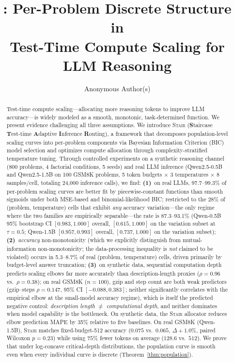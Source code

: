 \documentclass{article}
\title{\method{}: Per-Problem Discrete Structure in\\Test-Time Compute Scaling for LLM Reasoning}
\author{Anonymous Author(s)}
\newcommand{\method}{\textsc{Stair}}
\begin{document}
\maketitle

\begin{abstract}
Test-time compute scaling---allocating more reasoning tokens to improve LLM accuracy---is widely modeled as a smooth, monotonic, task-determined function.  We present evidence challenging all three assumptions.  We introduce \method{} (\textbf{S}taircase \textbf{T}est-time \textbf{A}daptive \textbf{I}nference \textbf{R}outing), a framework that decomposes population-level scaling curves into per-problem components via Bayesian Information Criterion (BIC) model selection and optimizes compute allocation through complexity-stratified temperature tuning.  Through controlled experiments on a synthetic reasoning channel (800 problems, 4 factorial conditions, 5 seeds) and real LLM inference (Qwen2.5-0.5B and Qwen2.5-1.5B on 100 GSM8K problems, 5 token budgets $\times$ 3 temperatures $\times$ 8 samples/cell, totaling 24{,}000 inference calls), we find:
\textbf{(1)}~on real LLMs, 97.7--99.3\% of per-problem scaling curves are better fit by piecewise-constant functions than smooth sigmoids under both MSE-based and binomial-likelihood BIC; restricted to the 28\% of (problem, temperature) cells that exhibit \emph{any} accuracy variation---the only regime where the two families are empirically separable---the rate is 87.3--93.1\% (Qwen-0.5B 95\% bootstrap CI $[0.983, 1.000]$ overall, $[0.615, 1.000]$ on the variation subset at $\tau{=}0.5$; Qwen-1.5B $[0.957, 0.993]$ overall, $[0.737, 1.000]$ on the variation subset);
\textbf{(2)}~\emph{accuracy} non-monotonicity (which we explicitly distinguish from mutual-information non-monotonicity; the data-processing inequality is \emph{not} claimed to be violated) occurs in 5.3--8.7\% of real (problem, temperature) cells, driven primarily by budget-level answer truncation;
\textbf{(3)}~on synthetic data, sequential computation depth predicts scaling elbows far more accurately than description-length proxies ($\rho{=}0.96$ vs.\ $\rho{=}0.38$); on real GSM8K ($n{=}100$), gzip and step count are both weak predictors (gzip--steps $\rho{=}0.147$, 95\% CI $[-0.088, 0.383]$; neither significantly correlates with the empirical elbow at the small-model accuracy regime), which is itself the predicted negative control: \emph{description length} $\neq$ \emph{computational depth}, and neither dominates when model capability is the bottleneck.
On synthetic data, the \method{} allocator reduces elbow prediction MAPE by 35\% relative to five baselines.  On real GSM8K (Qwen-1.5B), \method{} matches fixed-budget-512 accuracy ($0.075$ vs.\ $0.065$, $\Delta{+}1.0\%$, paired Wilcoxon $p{=}0.23$) while using $75\%$ fewer tokens on average ($128.6$ vs.\ $512$).  We prove that under log-concave critical-depth distributions, the population curve is smooth even when every individual curve is discrete (Theorem~\ref{thm:population}).
\end{abstract}
\end{document}
